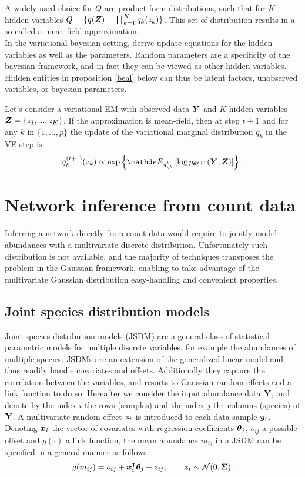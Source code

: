  A widely used choice for $Q$ are product-form distributions, such that for $K$ hidden variables $Q=\{q({\boldsymbol{Z}})=\prod_{k=1}^K q_k(z_k)\}$. This set of distribution results in a so-called a mean-field approximation. \\
 
In the variational bayesian setting, \citet{beal} derive update equations  for the hidden variables as well as the parameters. Random parameters are a specificity of the bayesian framework, and in fact they can be viewed as other hidden variables. Hidden entities in proposition \ref{beal} below can thus be latent factors, unobserved variables, or bayesian parameters.

 \begin{prop}\label{beal}
 Let's consider a variational EM with observed data ${\boldsymbol{Y}}$ and $K$ hidden variables ${\boldsymbol{Z}}=\{z_1,...,z_K\}$. If the approximation is mean-field, then at step $t+1$ and for any $k$ in $\{1,...,p\}$ the update of the variational marginal distribution $q_k$ in the VE step is:
$$ q_k^{(t+1)}(z_k)  \propto \exp \left\{ \Esp_{q_{\setminus k}^t} \left[ \log p_{\thetabf^{t+1}}(\Ybf, \Zbf) \right] \right\}.$$
\end{prop}


 
\section{Network inference from count data}
  Inferring a network directly from count data would require to jointly model abundances with a multivariate discrete distribution. Unfortunately such distribution is not available, and the majority of techniques transposes the problem in the Gaussian framework, enabling to take advantage of the multivariate Gaussian distribution easy-handling and convenient properties.
  
  \subsection{Joint species distribution models}
Joint species distribution models (JSDM) are a general class of statistical parametric models for multiple discrete variables, for example the abundances of multiple species. JSDMs are an extension of the generalized linear model and thus readily handle covariates and offsets. Additionally they capture the correlation between the variables, and resorts to Gaussian random effects and a link function to do so. Hereafter we consider the input abundance data ${\bf Y}$, and denote by the index $i$ the rows (samples) and the index $j$ the columns (species) of ${\bf Y}$. A multivariate random effect ${\boldsymbol{z}}_i$ is introduced to each data sample ${\boldsymbol{y}}_i$.  Denoting ${\boldsymbol{x}}_i$ the vector of covariates with regression coefficients ${\boldsymbol{\theta}}_j$, $o_{ij}$ a possible offset  and $g(\cdot)$ a link function, the mean abundance $m_{ij}$  in a JSDM can be specified in a general manner as follows:
$$g(m_{ij}) = o_{ij}+{\boldsymbol{x}}_i^\intercal  {\boldsymbol{\theta}}_j + z_{ij}, \qquad {\boldsymbol{z}}_i \sim \mathcal{N}(0, {\boldsymbol{\Sigma}}).$$

